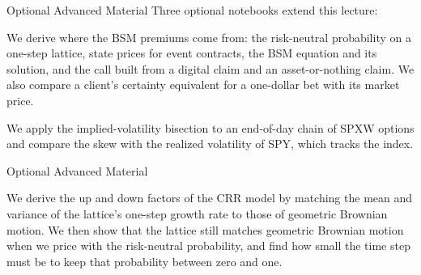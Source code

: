 \documentclass[aspectratio=169,11pt]{beamer}
\newcommand{\repo}{https://github.com/varnerlab/CHEME-5660-CourseRepository-Fall-2026/blob/main/lectures/week-9/L9b}
\begin{document}
\begin{frame}{Optional Advanced Material}
  Three optional notebooks extend this lecture:

  \vspace{0.4em}
  {\normalsize\textbf{} \par
  \href{\repo/advanced/contingent_claims/CHEME-5660-L9b-Advanced-ContingentClaims-BSM-Fall-2026.ipynb}{}}

  \vspace{0.4em}
  We derive where the BSM premiums come from: the risk-neutral probability on a
  one-step lattice, state prices for event contracts, the BSM equation and its
  solution, and the call built from a digital claim and an asset-or-nothing
  claim. We also compare a client's certainty equivalent for a one-dollar
  bet with its market price.

  \vspace{0.5em}
  {\normalsize\textbf{} \par
  \href{\repo/advanced/spxw_volatility_skew/CHEME-5660-L9b-Advanced-SPXW-Volatility-Skew-Fall-2026.ipynb}{}}

  \vspace{0.4em}
  We apply the implied-volatility bisection to an end-of-day chain of SPXW options
  and compare the skew with the realized volatility of SPY, which tracks the index.
  \end{frame}

\begin{frame}{Optional Advanced Material}
  \vspace{0.3em}
  {\normalsize\textbf{} \par
  \href{\repo/advanced/crr_factors/CHEME-5660-L9b-Advanced-CRR-Factors-Fall-2026.ipynb}{}}

  \vspace{0.5em}
  We derive the up and down factors of the CRR model by
  matching the mean and variance of the lattice's one-step growth rate to
  those of geometric Brownian motion. We then show that the lattice still
  matches geometric Brownian motion when we price with the risk-neutral
  probability, and find how small the time step must be to keep that
  probability between zero and one.
\end{frame}
\end{document}
